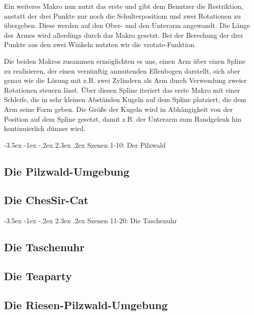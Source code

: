 \documentclass[twocolumn]{article}
\makeatletter
\renewcommand\section{\@startsection{section}{1}{\z@}%
                                      {-3.5ex \@plus -1ex \@minus -.2ex}%
                                      {2.3ex \@plus.2ex}%
                                      {\normalfont\large\bfseries}}
\makeatother
\begin{document}
Ein weiteres Makro nun nutzt das erste und gibt dem Benutzer die Restriktion, anstatt der drei Punkte nur noch die Schulterpositiom und zwei Rotationen zu übergeben.
Diese werden auf den Ober- und den Unterarm angewandt. Die Länge des Armes wird allerdings durch das Makro gesetzt.
Bei der Berechung der drei Punkte aus den zwei Winkeln nutzten wir die vrotate-Funktion.

Die beiden Makros zusammen ermöglichten es uns, einen Arm über einen Spline zu realisieren, der einen vernünftig anmutenden Ellenbogen darstellt, sich aber genau wie die Lösung mit z.B. zwei Zylindern als Arm durch Verwendung zweier Rotationen steuern lässt.
Über diesen Spline iteriert das erste Makro mit einer Schleife, die in sehr kleinen Abständen Kugeln auf dem Spline platziert, die dem Arm seine Form geben.
Die Größe der Kugeln wird in Abhängigkeit von der Position auf dem Spline gesetzt, damit z.B. der Unterarm zum Handgelenk hin kontinuierlich dünner wird.

\section{Szenen 1-10: Der Pilzwald}
\subsection{Die Pilzwald-Umgebung}
\subsection{Die ChesSir-Cat}

\section{Szenen 11-20: Die Taschenuhr}
\subsection{Die Taschenuhr}
\subsection{Die Teaparty}
\subsection{Die Riesen-Pilzwald-Umgebung}
\end{document}
